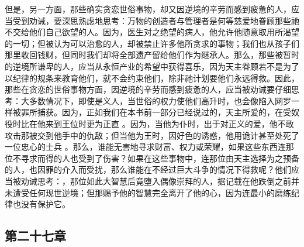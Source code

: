 但是，另一方面，那些确实贪恋世俗事物，却又因逆境的辛劳而感到疲惫的人，应当受到劝诫，要深思熟虑地思考：万物的创造者与管理者是何等慈爱地眷顾那些祂不交给他们自己欲望的人。因为，医生对之绝望的病人，他允许他随意取用所渴望的一切；但被认为可以治愈的人，却被禁止许多他所贪求的事物；我们也从孩子们那里收回钱财，但同时我们却将全部遗产留给他们作为继承人。那么，那些被暂时的逆境所谦卑的人，应当从永恒产业的希望中获得喜乐，因为天主眷顾若不是为了以纪律的规条来教育他们，就不会约束他们，除非祂计划要他们永远得救。因此，那些在贪恋的世俗事物方面，因逆境的辛劳而感到疲惫的人，应当被劝诫要仔细思考：大多数情况下，即使是义人，当世俗的权力使他们高升时，也会像陷入网罗一样被罪所捕获。因为，正如我们在本书前一部分已经说过的，天主所爱的，在受奴役时比在他来到王位时更为正直 。因为，当他为仆时，出于对正义的爱，他不敢攻击那被交到他手中的仇敌；但当他为王时，因好色的诱惑，他用诡计甚至处死了一位忠心的士兵 。那么，谁能无害地寻求财富、权力或荣耀，如果这些东西连那位不寻求而得的人也受到了伤害？如果在这些事物中，连那位由天主选择为之预备的人，也因罪的介入而受扰，那么谁能在不经过巨大斗争的情况下得救呢？他们应当被劝诫思考：，那位如此大智慧后竟堕入偶像崇拜的人，据记载在他跌倒之前并未遭受任何现世逆境；但那赐予他的智慧完全离开了他的心，因为连最小的磨练纪律也没有保护它。\par


\subsection{第二十七章}

\par

